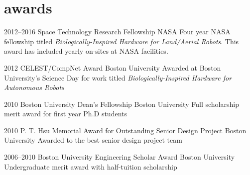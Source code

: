 \documentclass[print]{friggeri-cv} %
\begin{document}

\section{awards}

\begin{entrylist}


\entry
{2012--2016}
{Space Technology Research Fellowship}
{NASA}
{Four year NASA fellowship titled \emph{Biologically-Inspired Hardware for Land/Aerial Robots}. This award has included yearly on-sites at NASA facilities.}

\entry
{2012}
{CELEST/CompNet Award}
{Boston University}
{Awarded at Boston University's Science Day for work titled \emph{Biologically-Inspired Hardware for Autonomous Robots}}

\entry
{2010}
{Boston University Dean's Fellowship}
{Boston University}
{Full scholarship merit award for first year Ph.D students}

\entry
{2010}
{P. T. Hsu Memorial Award for Outstanding Senior Design Project}
{Boston University}
{Awarded to the best senior design project team}

\entry
{2006--2010}
{Boston University Engineering Scholar Award}
{Boston University}
{Undergraduate merit award with half-tuition scholarship}


\end{entrylist}




\end{document}
